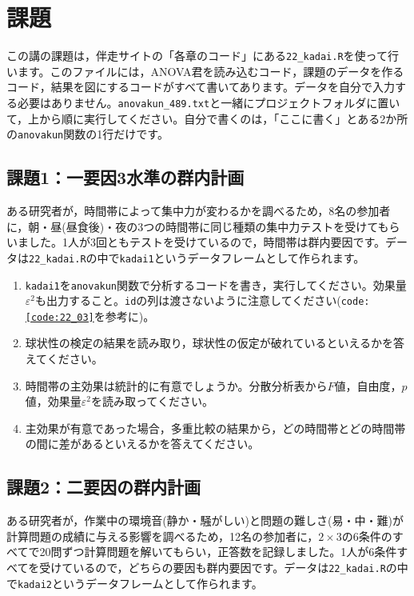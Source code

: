 \documentclass{ltjbook}
\begin{document}
\section{課題}

この講の課題は，伴走サイトの「各章のコード」にある\texttt{22\_kadai.R}を使って行います。このファイルには，ANOVA君を読み込むコード，課題のデータを作るコード，結果を図にするコードがすべて書いてあります。データを自分で入力する必要はありません。\texttt{anovakun\_489.txt}と一緒にプロジェクトフォルダに置いて，上から順に実行してください。自分で書くのは，「ここに書く」とある2か所の\verb|anovakun|関数の1行だけです。

\subsection{課題1：一要因3水準の群内計画}
ある研究者が，時間帯によって集中力が変わるかを調べるため，8名の参加者に，朝・昼(昼食後)・夜の3つの時間帯に同じ種類の集中力テストを受けてもらいました。1人が3回ともテストを受けているので，時間帯は群内要因です。データは\texttt{22\_kadai.R}の中で\texttt{kadai1}というデータフレームとして作られます。

\begin{enumerate}
	\item \texttt{kadai1}を\verb|anovakun|関数で分析するコードを書き，実行してください。効果量$\varepsilon^2$も出力すること。\texttt{id}の列は渡さないように注意してください(\texttt{code:\ref{code:22_03}}を参考に)。
	\item 球状性の検定の結果を読み取り，球状性の仮定が破れているといえるかを答えてください。
	\item 時間帯の主効果は統計的に有意でしょうか。分散分析表から$F$値，自由度，$p$値，効果量$\varepsilon^2$を読み取ってください。
	\item 主効果が有意であった場合，多重比較の結果から，どの時間帯とどの時間帯の間に差があるといえるかを答えてください。
\end{enumerate}

\subsection{課題2：二要因の群内計画}
ある研究者が，作業中の環境音(静か・騒がしい)と問題の難しさ(易・中・難)が計算問題の成績に与える影響を調べるため，12名の参加者に，$2 \times 3$の6条件のすべてで20問ずつ計算問題を解いてもらい，正答数を記録しました。1人が6条件すべてを受けているので，どちらの要因も群内要因です。データは\texttt{22\_kadai.R}の中で\texttt{kadai2}というデータフレームとして作られます。
\end{document}
